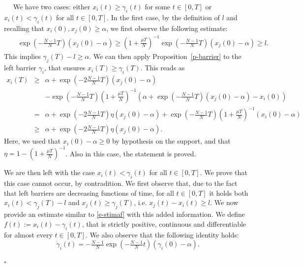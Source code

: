 \documentclass[10pt,a4paper]{amsart}
\newenvironment{proof}{{\it Proof.}~~}{\hfill$\square$}
\begin{document}
\begin{proof}
We have two cases: either $x_i(t)\geq \gamma_i(t)$ for some $t\in[0,T]$ or $x_i(t)< \gamma_i(t)$ for all $t\in[0,T]$. In the first case, by the definition of $l$ and recalling that $x_i(0),x_j(0)\geq\alpha$, we first observe the following estimate:
\begin{eqnarray*}
&&\exp(-\tfrac{N-1}{N}T)(x_j(0)-\alpha)\geq \left(1+\frac{\mu T}N\right)^{-1}\exp(-\tfrac{N-1}{N}T)(x_j(0)-\alpha) \geq l.
\end{eqnarray*}
This implies 
$\gamma_j(T)-l\geq \alpha$. We can then apply Proposition~\ref{p-barrier} to the left barrier $\gamma_i$, that ensures $x_i(T)\geq\gamma_i(T)$. This reads as
\begin{eqnarray*}
x_i(T)&\geq& \alpha+\exp(-2\tfrac{N-1}{N}T)(x_j(0)-\alpha)\\
&&-\exp(-\tfrac{N-1}{N}T)\left(1+\frac{\mu T}N\right)^{-1}(\alpha+\exp(-\tfrac{N-1}{N}T)(x_j(0)-\alpha)-x_i(0))\\
&=& \alpha+\exp(-2\tfrac{N-1}{N}T)\eta (x_j(0)-\alpha)+\exp(-\tfrac{N-1}{N}T)\left(1+\frac{\mu T}N\right)^{-1}(x_i(0)-\alpha)\\
&\geq& \alpha+\exp(-2\tfrac{N-1}{N}T)\eta (x_j(0)-\alpha).
\end{eqnarray*}
Here, we used that $x_i(0)-\alpha\geq 0$ by hypothesis on the support, and that $\eta=1-\left(1+\frac{\mu T}N\right)^{-1}$. Also in this case, the statement is proved.

We are then left with the case $x_i(t)< \gamma_i(t)$ for all $t\in[0,T]$. We prove that this case cannot occur, by contradition. We first observe that, due to the fact that left barriers are decreasing functions of time, for all $t\in[0,T]$ it holds both $x_i(t)< \gamma_j(T)-l$ and $x_j(t)\geq \gamma_j(T)$, i.e. $x_j(t)-x_i(t)\geq l$. We now provide an estimate similar to \eqref{e-stimaf} with this added information. We define $f(t):=x_i(t)-\gamma_i(t)$, that is strictly positive, continuous and differentiable for almost every $t\in[0,T]$. We also observe that the following identity holds:
$$\dot \gamma_i(t)=-\tfrac{N-1}{N}\exp(-\tfrac{N-1}{N}t)(\gamma_i(0)-\alpha).$$


\end{proof}
\end{document}
